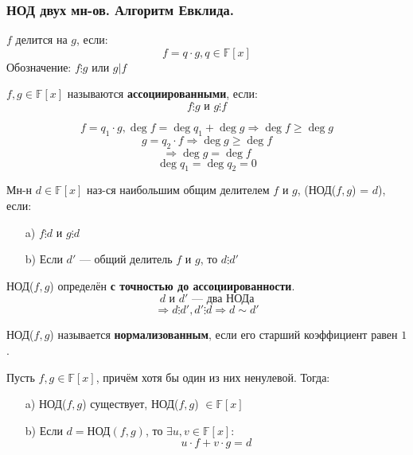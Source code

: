 \subsubsection{НОД двух мн-ов. Алгоритм Евклида.}
\begin{definition}
$f$ делится на $g$, если:
\[
  f = q \cdot g, q \in \mathbb{F}[x]
\]
Обозначение: $f \vdots g$ или $g | f$
\end{definition}
\begin{definition}
$f, g \in \mathbb{F}[x]$ называются \textbf{ассоциированными}, если:
\[
  f \vdots g \text{ и } g \vdots f
\]
\end{definition}
\[
f = q_1 \cdot g, \deg f = \deg q_1 + \deg g \Rightarrow \deg f \geq \deg g
\]
\[
g = q_2 \cdot f \Rightarrow \deg g \geq \deg f
\]
\[
\Rightarrow \deg g = \deg f
\]
\[
\deg q_1 = \deg q_2 = 0
\]
\begin{definition}[НОД]
Мн-н $d \in \mathbb{F}[x]$ наз-ся наибольшим общим делителем $f$ и $g$, (НОД($f, g$) = $d$), если:
\begin{itemize}
  \item [a) ] $f \vdots d$ и $g \vdots d$
  \item [b) ] Если $d'$ --- общий делитель $f$ и $g$, то $d \vdots d'$
\end{itemize}
\end{definition}
\begin{note}
НОД($f, g$) определён \textbf{с точностью до ассоциированности}.
\[
d \text{ и } d' \text{ --- два НОДа}
\]
\[
\Rightarrow d \vdots d', d' \vdots d \Rightarrow d \sim d'
\]
\end{note}
\begin{definition}
НОД($f, g$) называется \textbf{нормализованным}, если его старший коэффициент равен $1$.
\end{definition}
\begin{theorem}
\label{theorem:01_3}
Пусть $f, g \in \mathbb{F}[x]$, причём хотя бы один из них ненулевой. Тогда:
\begin{itemize}
  \item [a) ] НОД($f, g$) существует, НОД($f, g$) $\in \mathbb{F}[x]$
  \item [b) ] Если $d = \text{НОД}(f, g)$, то $\exists u, v \in \mathbb{F}[x]$:
    \[
    u \cdot f + v \cdot g = d
    \]
\end{itemize}
\end{theorem}
